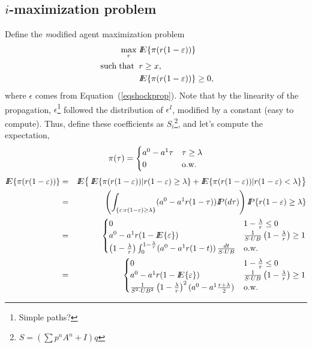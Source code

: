 \subsection{$i$-maximization problem}
Define the {\emph modified agent maximization problem}
\begin{align*}
\max_r&\;{I\kern-.35em E}\{ \pi(r(1-\varepsilon))\}\\
\mathop{\rm \;such\; that\;}\nolimits&\;r\geq x,\\
&\;{I\kern-.35em E}\{ \pi(r(1-\varepsilon))\}\geq 0,
\end{align*}
where $\epsilon$ comes from Equation~(\ref{eqshockprop}).  Note that by the linearity of the propagation, $\epsilon$\footnote{Simple paths?} followed the distribution of $\epsilon^I$, modified by a constant (easy to compute).  Thus, define these coefficients as $S_i$\footnote{$S=(\sum p^nA^n+I)q$}, and let's compute the expectation, 
\[\pi(\tau)=\begin{cases}a^0-a^1\tau& \tau\geq \lambda\\ 0&{\rm o.w.}\end{cases}\]
\begin{eqnarray*}
\Ex\{ \pi(r(1-\epsilon))\}&=&\Ex\lset\,\Ex\{ \pi(r(1-\epsilon))|r(1-\epsilon)\geq\lambda\}+\Ex\{ \pi(r(1-\epsilon))|r(1-\epsilon)<\lambda\}\rset\\
&=&\left(\int_{\{\epsilon:r(1-\epsilon)\geq \lambda\}}(a^0-a^1r(1-\tau))\Pro(d\tau) \right)\Pro\{r(1-\epsilon)\geq\lambda\}\\
&=&\begin{cases}
0&1-\frac{\lambda}{r}\leq 0\\
a^0-a^1r(1-\Ex\{\epsilon\})&\frac{1}{S\cdot UB}\left(1-\frac{\lambda}{r}\right)\geq 1\\
\left(1-\frac{\lambda}{r}\right)\int_0^{1-\frac{\lambda}{r}}(a^0-a^1r(1-t))\,\frac{dt}{S\cdot UB}&{\rm o.w.}
\end{cases}\\
&=&\begin{cases}
0&1-\frac{\lambda}{r}\leq 0\\
a^0-a^1r(1-\Ex\{\epsilon\})&\frac{1}{S\cdot UB}\left(1-\frac{\lambda}{r}\right)\geq 1\\
\frac{1}{S^2\cdot UB^2}\left(1-\frac{\lambda}{r}\right)^2(a^0-a^1\frac{r+\lambda}{2})\,&{\rm o.w.}
\end{cases}
\end{eqnarray*}